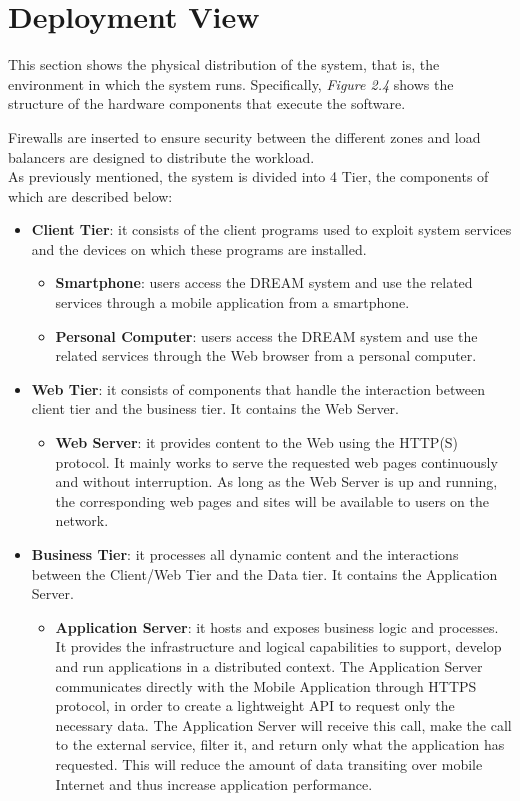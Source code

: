 \section{Deployment View}
This section shows the physical distribution of the system, that is, the environment in which the system runs. Specifically, \textit{Figure 2.4} shows the structure of the hardware components that execute the software.

Firewalls are inserted to ensure security between the different zones and load balancers are designed to distribute the workload.\\

As previously mentioned, the system is divided into 4 Tier, the components of which are described below:
\begin{itemize}
    \item \textbf{Client Tier}: it consists of the client programs used to exploit system services and the devices on which these programs are installed.
    \begin{itemize}
        \item \textbf{Smartphone}: users access the DREAM system and use the related services through a mobile application from a smartphone.
        \item \textbf{Personal Computer}: users access the DREAM system and use the related services through the Web browser from a personal computer.
    \end{itemize}
    \item \textbf{Web Tier}: it consists of components that handle the interaction between client tier and the business tier.  It contains the Web Server.
    \begin{itemize}
        \item \textbf{Web Server}: it provides content to the Web using the HTTP(S) protocol. It mainly works to serve the requested web pages continuously and without interruption. As long as the Web Server is up and running, the corresponding web pages and sites will be available to users on the network.
    \end{itemize}
    \item \textbf{Business Tier}: it processes all dynamic content and the interactions between the Client/Web Tier and the Data tier. It contains the Application Server.
    \begin{itemize}
        \item \textbf{Application Server}: it hosts and exposes business logic and processes. It provides the infrastructure and logical capabilities to support, develop and run applications in a distributed context. The Application Server communicates directly with the Mobile Application through HTTPS protocol, in order to create a lightweight API to request only the necessary data. The Application Server will receive this call, make the call to the external service, filter it, and return only what the application has requested.  This will reduce the amount of data transiting over mobile Internet and thus increase application performance.

\end{itemize}
\end{itemize}
